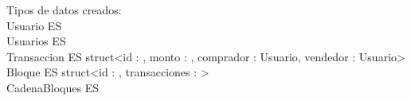\documentclass[10pt,a4paper]{article}
\newenvironment{IndentedBlock}
{
	\begin{list}{}{
			\leftmargin=2em
			\rightmargin=1em
			\topsep=0pt
			\partopsep=0pt
			\parsep=3pt
			\itemsep=0pt
		}
		\item\relax
	}
	{
	\end{list}
}
\begin{document}
\maketitle

\newcommand{\tadheader}[2]{
	{\normalfont\bfseries\ttfamily\noindent TAD}%
	\ %
	{\normalfont\ttfamily #1}%
	\ifthenelse{\equal{#2}{}}{}{%
		{$\langle$#2$\rangle$}%
	}%
}
\newenvironment{tad}[2]{
	\tadheader{#1}{#2}
	\{%
	\begin{IndentedBlock}
	}{
	\end{IndentedBlock}
	\}%
}

Tipos de datos creados:\\

Usuario ES \ent \\
Usuarios ES  \\
Transaccion ES  struct\textless id : \ent, monto : \ent, comprador : Usuario, vendedor : Usuario\textgreater \\
Bloque ES struct\textless id : \ent, transacciones : \textgreater \\
CadenaBloques ES  \\
\end{document}
